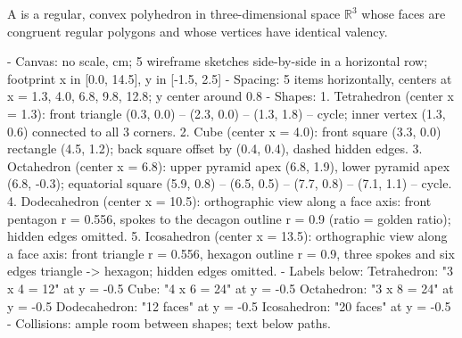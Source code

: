 \begin{content}
A  is a regular, convex polyhedron in three-dimensional space $\mathbb{R}^3$ whose faces are congruent regular polygons and whose vertices have identical valency.

\begin{hidden}
- Canvas: no scale, cm; 5 wireframe sketches side-by-side in a horizontal row;
  footprint x in [0.0, 14.5], y in [-1.5, 2.5]
- Spacing: 5 items horizontally, centers at x = 1.3, 4.0, 6.8, 9.8, 12.8; y center around 0.8
- Shapes:
  1. Tetrahedron (center x = 1.3): front triangle (0.3, 0.0) -- (2.3, 0.0) -- (1.3, 1.8) -- cycle;
     inner vertex (1.3, 0.6) connected to all 3 corners.
  2. Cube (center x = 4.0): front square (3.3, 0.0) rectangle (4.5, 1.2);
     back square offset by (0.4, 0.4), dashed hidden edges.
  3. Octahedron (center x = 6.8): upper pyramid apex (6.8, 1.9), lower pyramid apex (6.8, -0.3);
     equatorial square (5.9, 0.8) -- (6.5, 0.5) -- (7.7, 0.8) -- (7.1, 1.1) -- cycle.
  4. Dodecahedron (center x = 10.5): orthographic view along a face axis: front pentagon r = 0.556,
     spokes to the decagon outline r = 0.9 (ratio = golden ratio); hidden edges omitted.
  5. Icosahedron (center x = 13.5): orthographic view along a face axis: front triangle r = 0.556,
     hexagon outline r = 0.9, three spokes and six edges triangle -> hexagon; hidden edges omitted.
- Labels below:
  Tetrahedron: "3 x 4 = 12" at y = -0.5
  Cube: "4 x 6 = 24" at y = -0.5
  Octahedron: "3 x 8 = 24" at y = -0.5
  Dodecahedron: "12 faces" at y = -0.5
  Icosahedron: "20 faces" at y = -0.5
- Collisions: ample room between shapes; text below paths.
\end{hidden}
\begin{center}
\end{center}
\end{content}
